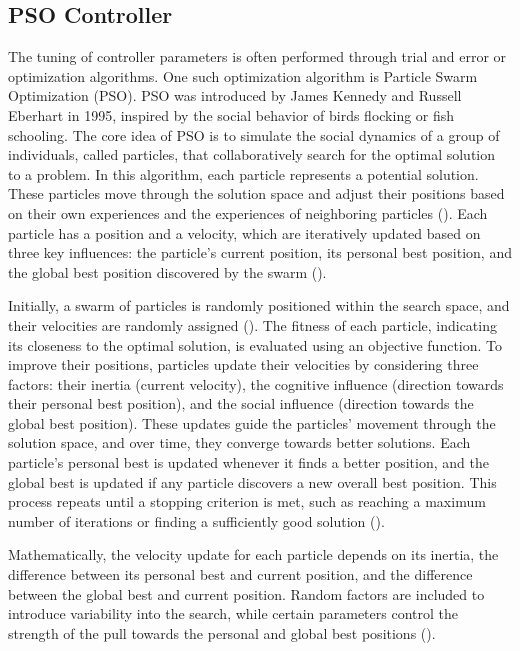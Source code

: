 \subsection{PSO Controller}

The tuning of controller parameters is often performed through trial and error or optimization algorithms. One such optimization algorithm is Particle Swarm Optimization (PSO). PSO was introduced by James Kennedy and Russell Eberhart in 1995, inspired by the social behavior of birds flocking or fish schooling. The core idea of PSO is to simulate the social dynamics of a group of individuals, called particles, that collaboratively search for the optimal solution to a problem. In this algorithm, each particle represents a potential solution. These particles move through the solution space and adjust their positions based on their own experiences and the experiences of neighboring particles (\cite{kennedy_discrete_1997}). Each particle has a position and a velocity, which are iteratively updated based on three key influences: the particle's current position, its personal best position, and the global best position discovered by the swarm (\cite{eberhart_new_1995}).

Initially, a swarm of particles is randomly positioned within the search space, and their velocities are randomly assigned (\cite{shi_parameter_1998}). The fitness of each particle, indicating its closeness to the optimal solution, is evaluated using an objective function. To improve their positions, particles update their velocities by considering three factors: their inertia (current velocity), the cognitive influence (direction towards their personal best position), and the social influence (direction towards the global best position). These updates guide the particles' movement through the solution space, and over time, they converge towards better solutions. Each particle's personal best is updated whenever it finds a better position, and the global best is updated if any particle discovers a new overall best position. This process repeats until a stopping criterion is met, such as reaching a maximum number of iterations or finding a sufficiently good solution (\cite{angeline_evolutionary_1998}).

Mathematically, the velocity update for each particle depends on its inertia, the difference between its personal best and current position, and the difference between the global best and current position. Random factors are included to introduce variability into the search, while certain parameters control the strength of the pull towards the personal and global best positions (\cite{ozcan_analysis_1998}).


